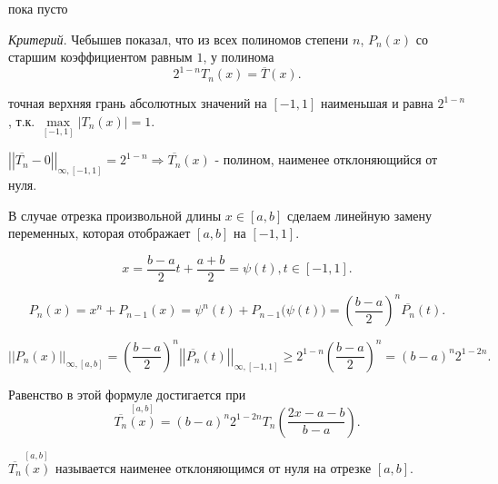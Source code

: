 \begin{col-answer-preambule}
	\begin{plan}
    \item пока пусто
	\end{plan}
\end{col-answer-preambule}


\textit{Критерий}.\newline
Чебышев показал, что из всех полиномов степени $n$, $P_n(x)$ со старшим коэффициентом равным $1$, у полинома
\begin{equation*}
  2^{1-n} T_n(x) = \overline{T}(x).
\end{equation*}

точная верхняя грань абсолютных значений на $[-1, 1]$ наименьшая и равна $2^{1-n}$, т.к. $\max\limits_{[-1, 1]} |T_n(x)| = 1$.

$\left|\left| \overline{T_n} - 0 \right| \right|_{\infty, [-1, 1]} = 2^{1-n} \Rightarrow \overline{T_n} (x)$ - полином, наименее отклоняющийся от нуля.

В случае отрезка произвольной длины $x \in [a, b]$ сделаем линейную замену переменных, которая отображает $[a, b]$ на $[-1, 1]$.

\begin{equation}\label{eq:8_2}
  x = \dfrac{b-a}{2} t + \dfrac{a+b}{2} = \psi(t), t \in [-1, 1].
\end{equation}

\begin{equation*}
  P_n(x) = x^n + P_{n-1}(x) = \psi^n (t) + P_{n-1} \Big( \psi(t) \Big) = \left(\dfrac{b-a}{2}\right)^n \overline{P_n}(t).
\end{equation*}

\begin{equation*}
  \left|\left| P_n(x) \right| \right|_{\infty, [a, b]} = \left(\dfrac{b-a}{2}\right)^n \left|\left| \overline{P_n}(t) \right| \right|_{\infty, [-1, 1]} \geqslant 2^{1-n} \left( \dfrac{b-a}{2} \right)^n = (b-a)^n 2^{1-2n}.
\end{equation*}

Равенство в этой формуле достигается при
\begin{equation*}
  \overline{T_n}\overset{[a, b]}{(x)} = (b - a)^n 2^{1-2n} T_n \left( \dfrac{2x - a - b}{b - a} \right).
\end{equation*}

$\overline{T_n}\overset{[a, b]}{(x)}$ называется наименее отклоняющимся от нуля на отрезке $[a, b]$.

